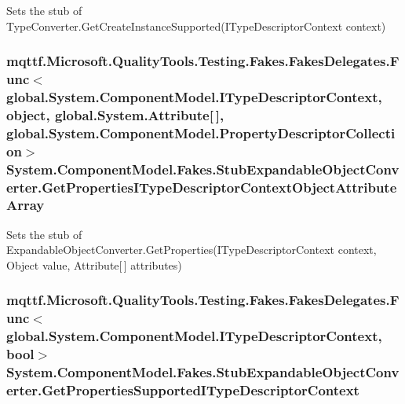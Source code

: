 Sets the stub of Type\-Converter.\-Get\-Create\-Instance\-Supported(\-I\-Type\-Descriptor\-Context context)

\hypertarget{class_system_1_1_component_model_1_1_fakes_1_1_stub_expandable_object_converter_a86b6015ac49dcde13b379b5f621d6230}{
\subsubsection[{Get\-Properties\-I\-Type\-Descriptor\-Context\-Object\-Attribute\-Array}]{\setlength{\rightskip}{0pt plus 5cm}mqttf.\-Microsoft.\-Quality\-Tools.\-Testing.\-Fakes.\-Fakes\-Delegates.\-Func$<$global.\-System.\-Component\-Model.\-I\-Type\-Descriptor\-Context, object, global.\-System.\-Attribute\mbox{[}$\,$\mbox{]}, global.\-System.\-Component\-Model.\-Property\-Descriptor\-Collection$>$ System.\-Component\-Model.\-Fakes.\-Stub\-Expandable\-Object\-Converter.\-Get\-Properties\-I\-Type\-Descriptor\-Context\-Object\-Attribute\-Array}}\label{class_system_1_1_component_model_1_1_fakes_1_1_stub_expandable_object_converter_a86b6015ac49dcde13b379b5f621d6230}


Sets the stub of Expandable\-Object\-Converter.\-Get\-Properties(\-I\-Type\-Descriptor\-Context context, Object value, Attribute\mbox{[}$\,$\mbox{]} attributes)

\hypertarget{class_system_1_1_component_model_1_1_fakes_1_1_stub_expandable_object_converter_a70409cb67e29b1351b529182386b05ab}{
\subsubsection[{Get\-Properties\-Supported\-I\-Type\-Descriptor\-Context}]{\setlength{\rightskip}{0pt plus 5cm}mqttf.\-Microsoft.\-Quality\-Tools.\-Testing.\-Fakes.\-Fakes\-Delegates.\-Func$<$global.\-System.\-Component\-Model.\-I\-Type\-Descriptor\-Context, bool$>$ System.\-Component\-Model.\-Fakes.\-Stub\-Expandable\-Object\-Converter.\-Get\-Properties\-Supported\-I\-Type\-Descriptor\-Context}}\label{class_system_1_1_component_model_1_1_fakes_1_1_stub_expandable_object_converter_a70409cb67e29b1351b529182386b05ab}


